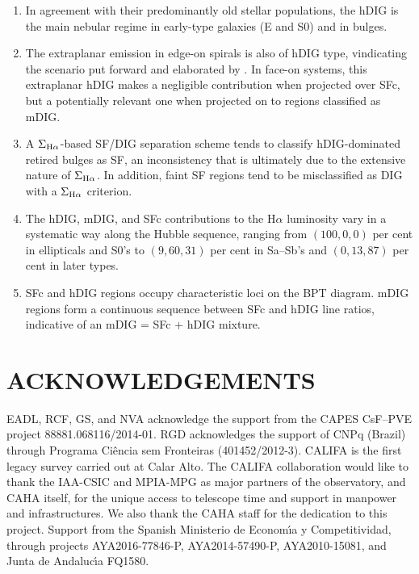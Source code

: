\documentclass[a4paper, fleqn, usenatbib, useAMS]{mnras}
\newcommand{\Ha}{\ifmmode {\rm H}\alpha \else H$\alpha$\fi\xspace}
\begin{document}
\begin{enumerate}

\item In agreement with their predominantly old stellar populations, the hDIG is the main nebular regime in early-type galaxies (E and S0) and in bulges.

\item The extraplanar emission in edge-on spirals is also of hDIG type, vindicating the scenario put forward and elaborated by \citet{FloresFajardo.etal.2011a}. In face-on systems, this extraplanar hDIG makes a negligible contribution when projected over SFc, but a potentially relevant one when projected on to regions classified as mDIG.

\item A $\Sigma_{\Ha}$-based SF/DIG separation scheme tends to classify hDIG-dominated retired bulges as SF, an inconsistency that is ultimately due to the extensive nature of $\Sigma_{\Ha}$. In addition, faint SF regions tend to be misclassified as DIG with a $\Sigma_{\Ha}$ criterion.

\item The hDIG, mDIG, and SFc contributions to the \Ha luminosity vary in a systematic way along the Hubble sequence, ranging from $(100, 0, 0)$ per cent in ellipticals and S0's to $(9, 60, 31)$ per cent in Sa--Sb's and $(0, 13, 87)$ per cent in later types.

\item SFc and hDIG regions occupy characteristic loci on the BPT diagram. mDIG regions form a continuous sequence between SFc and hDIG line ratios, indicative of an mDIG = SFc + hDIG mixture.

\end{enumerate}


\section*{ACKNOWLEDGEMENTS}
\noindent EADL, RCF, GS, and NVA acknowledge the support from the CAPES CsF--PVE project 88881.068116/2014-01. RGD acknowledges the support of CNPq (Brazil) through Programa Ci\^encia sem Fronteiras (401452/2012-3). CALIFA is the first legacy survey carried out at Calar Alto. The CALIFA collaboration would like to thank the IAA-CSIC and MPIA-MPG as major partners of the observatory, and CAHA itself, for the unique access to telescope time and support in manpower and infrastructures. We also thank the CAHA staff for the dedication to this project. Support from the Spanish Ministerio de Econom\'\i a y Competitividad, through projects AYA2016-77846-P, AYA2014-57490-P, AYA2010-15081, and Junta de Andaluc\'\i a FQ1580.




\bsp
\label{lastpage}
\end{document}
